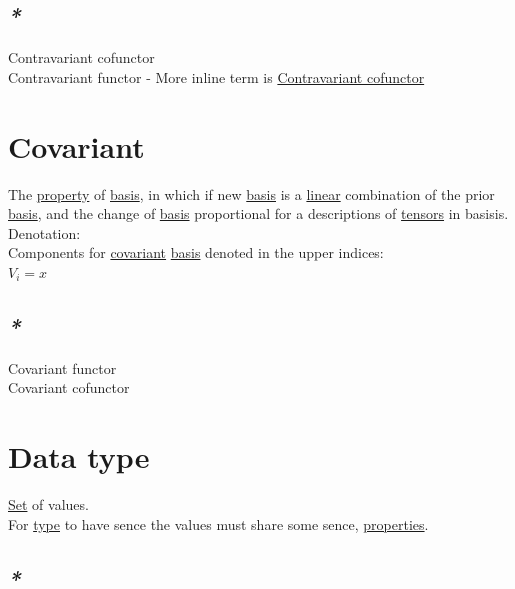 \documentclass[a4paper,14pt,oneside]{book}
\begin{document}
\section{\emph{*}}
\label{sec:org9409d22}

\label{orgdecac63}Contravariant cofunctor\\
\label{org5884f9d}Contravariant functor - More inline term is \hyperref[orgdecac63]{Contravariant cofunctor}\\

\chapter{\label{orgd54bd43}Covariant}
\label{sec:org97192d3}
The \hyperref[org91a1c9f]{property} of \hyperref[orge8a5e35]{basis}, in which if new \hyperref[orge8a5e35]{basis} is a \hyperref[orgdbc19f4]{linear} combination of the prior \hyperref[orge8a5e35]{basis}, and the change of \hyperref[orge8a5e35]{basis} proportional for a descriptions of \hyperref[org746e487]{tensors} in basisis.\\

Denotation:\\
Components for \hyperref[orgd54bd43]{covariant} \hyperref[orge8a5e35]{basis} denoted in the upper indices:\\
\(V_{i} = x\)\\

\section{\emph{*}}
\label{sec:org536186f}

\label{orgba2bdc2}Covariant functor\\
\label{orgc17354a}Covariant cofunctor\\

\chapter{\label{orgbde1baf}Data type}
\label{sec:org9705b35}
\hyperref[orge119629]{Set} of values.\\
For \hyperref[orgd6db20c]{type} to have sence the values must share some sence, \hyperref[org1feb373]{properties}.\\

\section{\emph{*}}
\label{sec:orga8aaa40}
\end{document}
